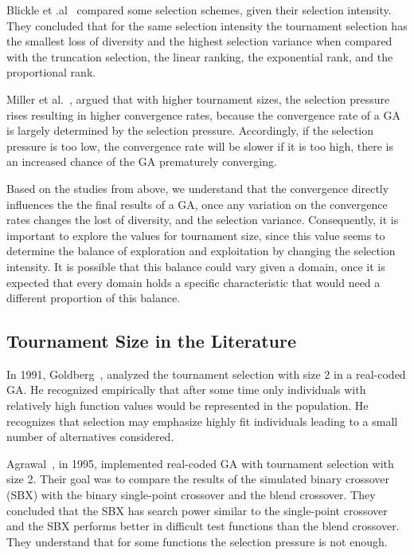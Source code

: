 Blickle et .al~\cite{blickle1995comparison} compared some selection schemes, given their selection intensity. They concluded that for the same selection intensity the tournament selection has the smallest loss of diversity and the highest selection variance when compared with the truncation selection, the linear ranking, the exponential rank, and the proportional rank.

Miller et al.~\cite{miller1995genetic}, argued that with higher tournament sizes, the selection pressure rises resulting in higher convergence rates, because the convergence rate of a GA is largely determined by the selection pressure.  Accordingly, if the selection pressure is too low, the convergence rate will be slower if it is too high, there is an increased chance of the GA prematurely converging.

Based on the studies from above, we understand that the convergence directly influences the the final results of a GA, once any variation on the convergence rates changes the lost of diversity, and the selection variance. Consequently, it is important to explore the values for tournament size, since this value seems to determine the balance of exploration and exploitation by changing the selection intensity. It is possible that this balance could vary given a domain, once it is expected that every domain holds a specific characteristic that would need a different proportion of this balance.

\subsection{Tournament Size in the Literature}\label{sec:background:tournament_size} 

In 1991, Goldberg~\cite{goldberg1991real}, analyzed the tournament selection with size 2 in a real-coded GA. He recognized empirically that after some time only individuals with relatively high function values would be represented in the population. He recognizes that selection may emphasize highly fit individuals leading to a small number of alternatives considered.

Agrawal~\cite{agrawal1995simulated}, in 1995, implemented real-coded GA with tournament selection with size 2. Their goal was to compare the results of the simulated binary crossover (SBX) with the binary single-point crossover and the blend crossover. They concluded that the SBX has search power similar to the single-point crossover and the SBX performs better in difficult test functions than the blend crossover. They understand that for some functions the selection pressure is not enough.

